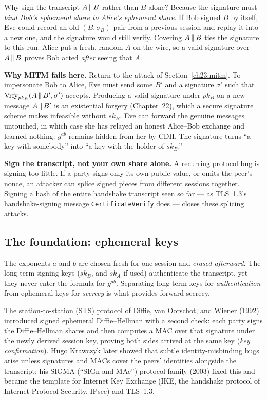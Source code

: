 Why sign the transcript $A\,\|\, B$ rather than $B$ alone? Because the
signature must \emph{bind Bob's ephemeral share to Alice's ephemeral share}. If
Bob signed $B$ by itself, Eve could record an old $(B,\sigma_B)$ pair from a
previous session and replay it into a new one, and the signature would still
verify. Covering $A\,\|\, B$ ties the signature to this run: Alice put a fresh,
random $A$ on the wire, so a valid signature over $A\,\|\, B$ proves Bob acted
\emph{after} seeing that $A$.

\begin{whybox}
\textbf{Why MITM fails here.}
Return to the attack of Section~\ref{ch23:mitm}. To impersonate Bob to Alice,
Eve must send some $B'$ and a signature $\sigma'$ such that
$\operatorname{Vrfy}_{pk_B}(A\,\|\, B',\sigma')$ accepts. Producing a valid signature under
$pk_B$ on a new message $A\,\|\, B'$ is an existential forgery (Chapter~22),
which a secure signature scheme makes infeasible without $sk_B$. Eve can forward
the genuine messages untouched, in which case she has relayed an honest
Alice--Bob exchange and learned nothing: $g^{ab}$ remains hidden from her by
CDH. The signature turns ``a key with somebody'' into ``a key with the holder
of $sk_B$.''
\end{whybox}

\begin{trapbox}
\textbf{Sign the transcript, not your own share alone.}
A recurring protocol bug is signing too little. If a party signs only its own
public value, or omits the peer's nonce, an attacker can splice signed pieces
from different sessions together. Signing a hash of the entire handshake
transcript seen so far --- as TLS~1.3's handshake-signing message
\texttt{CertificateVerify} does --- closes these splicing attacks.
\end{trapbox}

\subsection{The foundation: ephemeral keys}

The exponents $a$ and $b$ are chosen fresh for one session and \emph{erased
afterward}. The long-term signing keys ($sk_B$, and $sk_A$ if used) authenticate
the transcript, yet they never enter the formula for $g^{ab}$. Separating
long-term keys for \emph{authentication} from ephemeral keys for \emph{secrecy}
is what provides forward secrecy.

\begin{historybox}
The station-to-station (STS) protocol of Diffie, van Oorschot, and Wiener (1992)
introduced signed ephemeral Diffie--Hellman with a second check: each party
signs the Diffie--Hellman shares and then computes a MAC over that signature
under the newly derived session key, proving both sides arrived at the same key
(\emph{key confirmation}). Hugo Krawczyk later showed that subtle
identity-misbinding bugs arise unless signatures and MACs cover the peers'
identities alongside the transcript; his \textsc{SIGMA} (``SIGn-and-MAc'')
protocol family (2003) fixed this and became the template for Internet Key
Exchange (IKE, the handshake protocol of Internet Protocol Security, IPsec) and
TLS~1.3.
\end{historybox}


